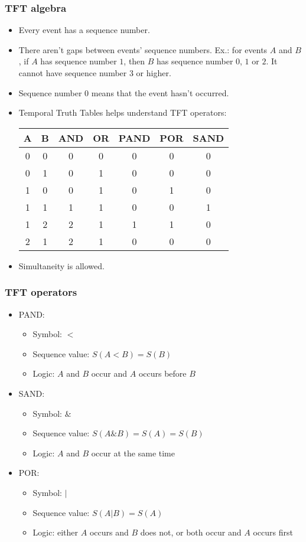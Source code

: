 \begin{frame}
\frametitle{TFT algebra}

\begin{itemize}
  \item Every event has a sequence number.
  \item There aren't gaps between events' sequence numbers. Ex.: for events $A$ and $B$, if $A$ has sequence number $1$, then $B$ has sequence number $0$, $1$ or $2$. It cannot have sequence number $3$ or higher.
  \item Sequence number $0$ means that the event hasn't occurred.
  \item Temporal Truth Tables helps understand TFT operators:
  {
  \scriptsize
  \begin{tabular}{c|c|c|c|c|c|c}
  A & B & AND & OR & PAND & POR & SAND\\
  \hline
  0 & 0 & 0 & 0 & 0 & 0 & 0\\
  \hline
  0 & 1 & 0 & 1 & 0 & 0 & 0\\
  \hline
  1 & 0 & 0 & 1 & 0 & 1 & 0\\
  \hline
  1 & 1 & 1 & 1 & 0 & 0 & 1\\
  \hline
  1 & 2 & 2 & 1 & 1 & 1 & 0\\
  \hline
  2 & 1 & 2 & 1 & 0 & 0 & 0\\
  \hline
  \end{tabular}
  }
  \item Simultaneity is allowed.
\end{itemize}

\end{frame}

\begin{frame}
\frametitle{TFT operators}

\begin{itemize}
  \item PAND: 
    \begin{itemize}
      \item Symbol: $<$
      \item Sequence value: $S(A<B) = S(B)$
      \item Logic: $A$ and $B$ occur and $A$ occurs before $B$
    \end{itemize}
  \item SAND: 
    \begin{itemize}
      \item Symbol: $\&$
      \item Sequence value: $S(A\&B) = S(A) = S(B)$
      \item Logic: $A$ and $B$ occur at the same time
    \end{itemize}
  \item POR: 
    \begin{itemize}
      \item Symbol: $|$
      \item Sequence value: $S(A|B) = S(A)$
      \item Logic: either $A$ occurs and $B$ does not, or both occur and $A$ occurs first
    \end{itemize}
\end{itemize}
\end{frame}

